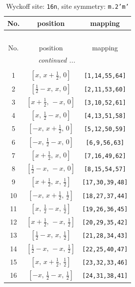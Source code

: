 \documentclass[fleqn,8pt]{jsarticle}
\begin{document}
\renewcommand{\arraystretch}{1.2}
\begin{longtable}{ccc}
\caption{Wyckoff site: {\tt 16n}, site symmetry: {\tt m.2'm'}}
 \\
 \hline \hline
No. & position & mapping \\ \hline \endfirsthead

\multicolumn{2}{l}{\tablename\ \thetable{}} \\
 \hline \hline
No. & position & mapping \\ \hline \endhead

 \hline \hline
\multicolumn{2}{r}{\footnotesize\it continued ...} \\ \endfoot

 \hline \hline
\multicolumn{2}{r}{} \\ \endlastfoot

1 & $\left[ x,\, x + \frac{1}{2},\, 0 \right]$ & {\tt [1,14,55,64]} \\ \hline
2 & $\left[ \frac{1}{2} - x,\, x,\, 0 \right]$ & {\tt [2,11,53,60]} \\ \hline
3 & $\left[ x + \frac{1}{2},\, - x,\, 0 \right]$ & {\tt [3,10,52,61]} \\ \hline
4 & $\left[ x,\, \frac{1}{2} - x,\, 0 \right]$ & {\tt [4,13,51,58]} \\ \hline
5 & $\left[ - x,\, x + \frac{1}{2},\, 0 \right]$ & {\tt [5,12,50,59]} \\ \hline
6 & $\left[ - x,\, \frac{1}{2} - x,\, 0 \right]$ & {\tt [6,9,56,63]} \\ \hline
7 & $\left[ x + \frac{1}{2},\, x,\, 0 \right]$ & {\tt [7,16,49,62]} \\ \hline
8 & $\left[ \frac{1}{2} - x,\, - x,\, 0 \right]$ & {\tt [8,15,54,57]} \\ \hline
9 & $\left[ x + \frac{1}{2},\, x,\, \frac{1}{2} \right]$ & {\tt [17,30,39,48]} \\ \hline
10 & $\left[ - x,\, x + \frac{1}{2},\, \frac{1}{2} \right]$ & {\tt [18,27,37,44]} \\ \hline
11 & $\left[ x,\, \frac{1}{2} - x,\, \frac{1}{2} \right]$ & {\tt [19,26,36,45]} \\ \hline
12 & $\left[ x + \frac{1}{2},\, - x,\, \frac{1}{2} \right]$ & {\tt [20,29,35,42]} \\ \hline
13 & $\left[ \frac{1}{2} - x,\, x,\, \frac{1}{2} \right]$ & {\tt [21,28,34,43]} \\ \hline
14 & $\left[ \frac{1}{2} - x,\, - x,\, \frac{1}{2} \right]$ & {\tt [22,25,40,47]} \\ \hline
15 & $\left[ x,\, x + \frac{1}{2},\, \frac{1}{2} \right]$ & {\tt [23,32,33,46]} \\ \hline
16 & $\left[ - x,\, \frac{1}{2} - x,\, \frac{1}{2} \right]$ & {\tt [24,31,38,41]} \\
\end{longtable}
\end{document}
